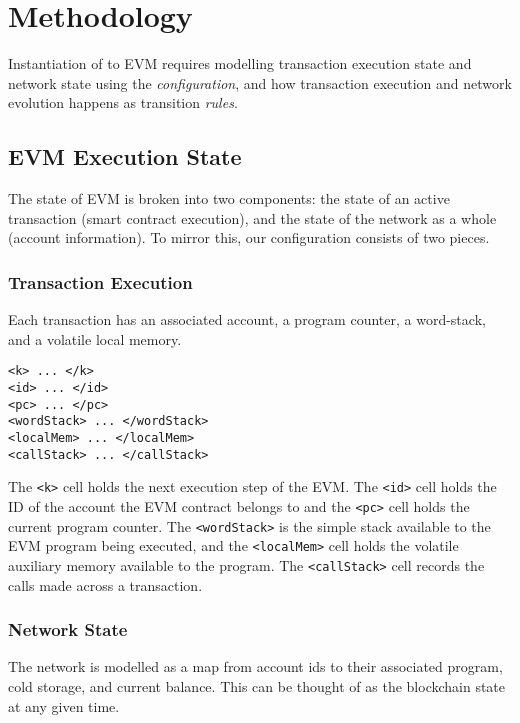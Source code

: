 \section{Methodology}

Instantiation of \K to EVM requires modelling transaction execution state and
network state using the \textit{configuration}, and how transaction execution
and network evolution happens as transition \textit{rules}.

\subsection{EVM Execution State}

The state of EVM is broken into two components: the state of an active
transaction (smart contract execution), and the state of the network as a whole
(account information). To mirror this, our configuration consists of two pieces.

\subsubsection{Transaction Execution}

Each transaction has an associated account, a program counter, a word-stack, and
a volatile local memory.

\begin{verbatim}
<k> ... </k>
<id> ... </id>
<pc> ... </pc>
<wordStack> ... </wordStack>
<localMem> ... </localMem>
<callStack> ... </callStack>
\end{verbatim}

The \texttt{<k>} cell holds the next execution step of the EVM.  The
\texttt{<id>} cell holds the ID of the account the EVM contract belongs to and
the \texttt{<pc>} cell holds the current program counter. The
\texttt{<wordStack>} is the simple stack available to the EVM program being
executed, and the \texttt{<localMem>} cell holds the volatile auxiliary memory
available to the program. The \texttt{<callStack>} cell records the calls made
across a transaction.

\subsubsection{Network State}

The network is modelled as a map from account ids to their associated program,
cold storage, and current balance. This can be thought of as the blockchain
state at any given time.

